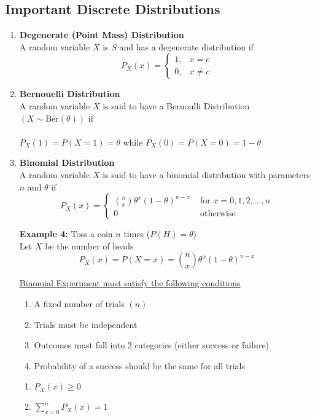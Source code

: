 \documentclass[12pt, twoside]{article}
\begin{document}
\subsection{Important Discrete Distributions}
\begin{enumerate}
	\item{
	\textbf{Degenerate (Point Mass) Distribution}\\
	A random variable $X$ is $S$ and has a degenerate distribution if
	$$P_X (x) = 
	\begin{cases}
	1, & x=c\\
	0, & x\neq c
\end{cases}$$
	}
	\item{
	\textbf{Bernouelli Distribution}\\
	A random variable $X$ is said to have a Bernoulli Distribution $(X \sim \text{Ber}(\theta))$ if\\
	\\
	$P_X (1) = P(X = 1) = \theta$ while $P_X (0) = P(X = 0) = 1-\theta$
	}
	\item{
	\textbf{Binomial Distribution}\\
	A random variable $X$ is said to have a binomial distribution with parameters $n$ and $\theta$ if
	$$P_X (x) =
	\begin{cases} 
		\binom{n}{x} \theta^x (1-\theta)^{n-x} & \text{ for } x = 0,1,2,...,n\\
		0 & \text{ otherwise }
	\end{cases}$$
	
	\textbf{Example 4:} Toss a coin $n$ times ($P(H) = \theta$)\\
Let $X$ be the number of heads\\
$$P_X (x) = P(X = x) = \binom{n}{x} \theta^x (1-\theta)^{n-x}$$

\underline{Binomial Experiment must satisfy the following conditions}
\begin{enumerate}
	\item{A fixed number of trials $(n)$}
	\item{Trials must be independent}
	\item{Outcomes must fall into 2 categories (either success or failure)}
	\item{Probability of a success should be the same for all trials}
\end{enumerate}

\begin{tcolorbox}[title=Note]
	\begin{enumerate}
		\item{$P_X (x) \geq 0$}
		\item{$\sum_{x=0}^n P_X (x) = 1$}
	\end{enumerate}
\end{tcolorbox}

}
\end{enumerate}
\end{document}
